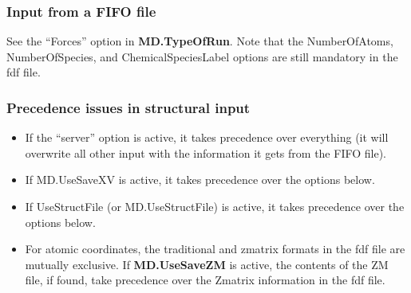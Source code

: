 \documentclass[11pt]{article}
\begin{document}
\subsubsection{Input from a FIFO file}

See the ``Forces'' option in {\bf MD.TypeOfRun}.
Note that the NumberOfAtoms, NumberOfSpecies, and ChemicalSpeciesLabel
options are still mandatory in the fdf file.

\subsubsection{Precedence issues in structural input}

\begin{itemize}
\item If the ``server'' option is active, it takes precedence over
everything (it will overwrite all other input with the information it
gets from the FIFO file).

\item If MD.UseSaveXV is active, it takes precedence over the options below.

\item If UseStructFile (or MD.UseStructFile) is active, it takes precedence
over the options below.

\item For atomic coordinates, the traditional and zmatrix formats in
  the fdf file are mutually exclusive. If {\bf MD.UseSaveZM} is
  active, the contents of the ZM file, if found, take precedence over
  the Zmatrix information in the fdf file.

\end{itemize}
\end{document}

